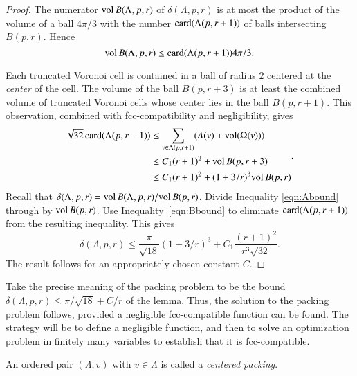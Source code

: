 \begin{proof}
The numerator ${\operatorname{vol}}\, B(\Lambda,p,r)$ of $\delta(\Lambda,p,r)$
is at most the product of the volume of a ball $4\pi/3$ with the
number ${\operatorname{card}}(\Lambda(p,r+1))$ of balls intersecting $B(p,r)$.  Hence
    \begin{equation}
    {\operatorname{vol}}\, B(\Lambda,p,r) \le {\operatorname{card}}(\Lambda(p,r+1)) 4\pi/3.
    \label{eqn:Abound}
    \end{equation}

Each truncated Voronoi cell is contained in a ball of
radius $2$ centered at the {\it center} of the cell.  The volume
of the ball $B(p,r+3)$ is at least the combined volume of 
truncated Voronoi
cells whose center lies in the ball $B(p,r+1)$. This observation,
combined with fcc-compatibility and negligibility, gives
    \begin{equation}
    \begin{split}
    \sqrt{32}\,{\operatorname{card}}(\Lambda(p,r+1))
    &\le \sum_{v\in\Lambda(p,r+1)} (A(v) +
    {\operatorname{vol}}(\Omega(v))) \\
    &\le C_1 (r+1)^2 + {\operatorname{vol}}\,B(p,r+3) \\
    &\le C_1 (r+1)^2 + (1+3/r)^3 {\operatorname{vol}}\,B(p,r)
    \label{eqn:Bbound}
    \end{split}.
    \end{equation}
Recall that $\delta(\Lambda,p,r)=
{\operatorname{vol}}\,B(\Lambda,p,r)/{\operatorname{vol}}\,B(p,r)$. Divide Inequality
\ref{eqn:Abound} through by ${\operatorname{vol}}\,B(p,r)$.  Use
Inequality~\ref{eqn:Bbound} to eliminate ${\operatorname{card}}(\Lambda(p,r+1))$ from the
resulting inequality.  This gives
    $$\delta(\Lambda,p,r)
        \le \frac{\pi}{\sqrt{18}} (1+3/r)^3 + C_1 \frac{(r+1)^2}{r^3\sqrt{32}}.
    $$
The result follows for an appropriately chosen constant $C$.
\end{proof}

\begin{remark} \label{remark:precise}
Take the precise meaning of the packing problem to be the
bound $\delta(\Lambda,p,r) \le \pi/\sqrt{18} + C/r$ of the lemma.
Thus, the solution to the packing problem follows, provided a negligible
fcc-compatible function can be found. The strategy will be to
define a negligible function, and then to solve an optimization
problem in finitely many variables to establish that it is
fcc-compatible.
\end{remark}

An ordered pair $(\Lambda,v)$ with $v\in\Lambda$ is called a {\it centered packing}.


